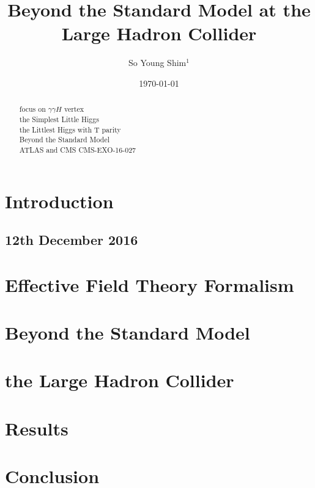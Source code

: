 \documentclass[aps,preprint,floatfix,nofootinbib,showpacs]{revtex4-1}
\begin{document}
\title{Beyond the Standard Model at the Large Hadron Collider}
\bigskip
\author{So Young Shim$^{1}$}
\date{\today}

\begin{abstract}
focus on $\gamma\gamma H$ vertex\\
the Simplest Little Higgs\\
the Littlest Higgs with T parity \\
Beyond the Standard Model \\
ATLAS and CMS
CMS-EXO-16-027\\
\end{abstract}

\maketitle
\tableofcontents

\section{Introduction}
\subsection{12th December 2016}

\section{Effective Field Theory Formalism}
\section{Beyond the Standard Model}
\section{the Large Hadron Collider}
\section{Results}
\section{Conclusion}
\end{document}
